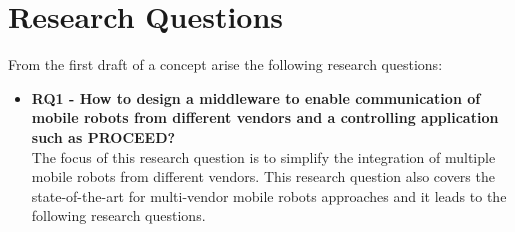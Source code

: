 \section{Research Questions}
From the first draft of a concept arise the following research questions:
\begin{itemize}
   \item \textbf{RQ1 - How to design a middleware to enable communication of mobile robots from different vendors and a controlling application such as PROCEED?} \hfill \\ 
The focus of this research question is to simplify the integration of multiple mobile robots from different vendors. This research question also covers the state-of-the-art for multi-vendor mobile robots approaches and it leads to the following research questions.
\begin{itemize}


\end{itemize}
\end{itemize}
